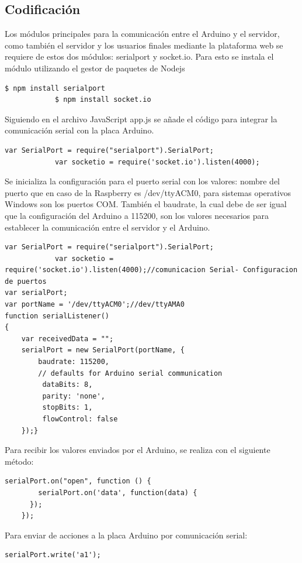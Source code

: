 \documentclass[11pt,letterpaper]{report}
\begin{document}
	\subsection{Codificación}
	Los módulos principales para la comunicación entre el Arduino y el servidor, como también el servidor y los usuarios finales mediante la plataforma web  se requiere de estos dos módulos: serialport y socket.io. Para esto se instala el módulo utilizando el gestor de paquetes de Nodejs 
		\begin{lstlisting}[language=bash]
			$ npm install serialport
			$ npm install socket.io
		\end{lstlisting}
Siguiendo en el archivo JavaScript  app.js se añade el código para integrar la comunicación serial con la placa Arduino.
		\begin{lstlisting}[language=Arduino]
			var SerialPort = require("serialport").SerialPort;
			var socketio = require('socket.io').listen(4000);
		\end{lstlisting}
		Se inicializa la configuración para  el puerto serial con los  valores: nombre del puerto que en caso de la Raspberry es /dev/ttyACM0, para sistemas operativos Windows  son los  puertos COM. También el baudrate, la cual debe de ser igual que la configuración del Arduino a 115200, son los valores necesarios para establecer la comunicación entre el servidor y el Arduino.
		\begin{lstlisting}[language=Arduino]
			var SerialPort = require("serialport").SerialPort;
			var socketio = require('socket.io').listen(4000);//comunicacion Serial- Configuracion de puertos 
var serialPort;
var portName = '/dev/ttyACM0';//dev/ttyAMA0
function serialListener()
{
    var receivedData = "";
    serialPort = new SerialPort(portName, {
        baudrate: 115200,
        // defaults for Arduino serial communication
         dataBits: 8,
         parity: 'none',
         stopBits: 1,
         flowControl: false
    });}
		\end{lstlisting}	
Para recibir los valores enviados por el Arduino, se realiza con el siguiente método:
		\begin{lstlisting}[language=Arduino]
			serialPort.on("open", function () {
        serialPort.on('data', function(data) {
      });
    });
		\end{lstlisting}	
Para enviar de acciones a la placa Arduino por comunicación serial:
		\begin{lstlisting}[language=Arduino]
			serialPort.write('a1');
		\end{lstlisting}	
\end{document}
